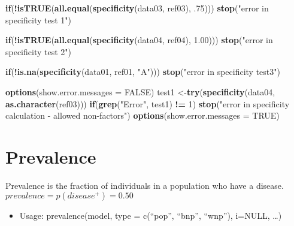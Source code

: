 \documentclass[]{article}
\newenvironment{Shaded}{\begin{snugshade}}{\end{snugshade}}
\newcommand{\ControlFlowTok}[1]{\textcolor[rgb]{0.13,0.29,0.53}{\textbf{#1}}}
\newcommand{\DataTypeTok}[1]{\textcolor[rgb]{0.13,0.29,0.53}{#1}}
\newcommand{\DecValTok}[1]{\textcolor[rgb]{0.00,0.00,0.81}{#1}}
\newcommand{\FloatTok}[1]{\textcolor[rgb]{0.00,0.00,0.81}{#1}}
\newcommand{\KeywordTok}[1]{\textcolor[rgb]{0.13,0.29,0.53}{\textbf{#1}}}
\newcommand{\NormalTok}[1]{#1}
\newcommand{\OperatorTok}[1]{\textcolor[rgb]{0.81,0.36,0.00}{\textbf{#1}}}
\newcommand{\OtherTok}[1]{\textcolor[rgb]{0.56,0.35,0.01}{#1}}
\newcommand{\StringTok}[1]{\textcolor[rgb]{0.31,0.60,0.02}{#1}}
\providecommand{\tightlist}{%
  \setlength{\itemsep}{0pt}\setlength{\parskip}{0pt}}
\begin{document}
\begin{Shaded}
\begin{Highlighting}[]
   \ControlFlowTok{if}\NormalTok{(}\OperatorTok{!}\KeywordTok{isTRUE}\NormalTok{(}\KeywordTok{all.equal}\NormalTok{(}\KeywordTok{specificity}\NormalTok{(data03, ref03), }\FloatTok{.75}\NormalTok{))) }\KeywordTok{stop}\NormalTok{(}\StringTok{"error in specificity test 1"}\NormalTok{)}

   \ControlFlowTok{if}\NormalTok{(}\OperatorTok{!}\KeywordTok{isTRUE}\NormalTok{(}\KeywordTok{all.equal}\NormalTok{(}\KeywordTok{specificity}\NormalTok{(data04, ref04), }\FloatTok{1.00}\NormalTok{))) }\KeywordTok{stop}\NormalTok{(}\StringTok{"error in specificity test 2"}\NormalTok{)}

   \ControlFlowTok{if}\NormalTok{(}\OperatorTok{!}\KeywordTok{is.na}\NormalTok{(}\KeywordTok{specificity}\NormalTok{(data01, ref01, }\StringTok{"A"}\NormalTok{))) }\KeywordTok{stop}\NormalTok{(}\StringTok{"error in specificity test3"}\NormalTok{)}
      
   \KeywordTok{options}\NormalTok{(}\DataTypeTok{show.error.messages =} \OtherTok{FALSE}\NormalTok{)}
\NormalTok{   test1 <-}\KeywordTok{try}\NormalTok{(}\KeywordTok{specificity}\NormalTok{(data04, }\KeywordTok{as.character}\NormalTok{(ref03)))}
   \ControlFlowTok{if}\NormalTok{(}\KeywordTok{grep}\NormalTok{(}\StringTok{"Error"}\NormalTok{, test1) }\OperatorTok{!=}\StringTok{ }\DecValTok{1}\NormalTok{)}
      \KeywordTok{stop}\NormalTok{(}\StringTok{"error in specificity calculation - allowed non-factors"}\NormalTok{)}
   \KeywordTok{options}\NormalTok{(}\DataTypeTok{show.error.messages =} \OtherTok{TRUE}\NormalTok{)}
\end{Highlighting}
\end{Shaded}

\hypertarget{prevalence}{%
\section{Prevalence}\label{prevalence}}

Prevalence is the fraction of individuals in a population who have a
disease. \(prevalence = p(disease^+) = 0.50\)

\begin{itemize}
\tightlist
\item
  Usage: prevalence(model, type = c(``pop'', ``bnp'', ``wnp''), i=NULL,
  \ldots{})
\end{itemize}
\end{document}
